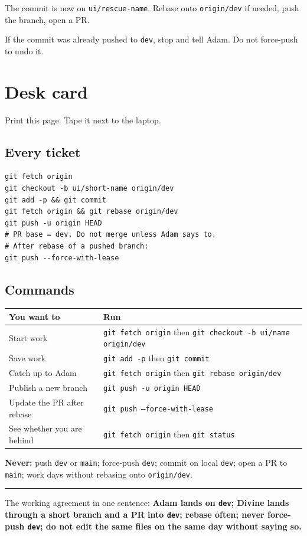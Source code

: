 \documentclass[11pt]{article}
\begin{document}
The commit is now on \texttt{ui/rescue-name}. Rebase onto \texttt{origin/dev} if needed, push the branch, open a PR.

If the commit was already pushed to \texttt{dev}, stop and tell Adam. Do not force-push to undo it.

\clearpage
\section{Desk card}

Print this page. Tape it next to the laptop.

\subsection*{Every ticket}

\begin{Verbatim}[fontsize=\small,frame=single,framesep=5pt]
git fetch origin
git checkout -b ui/short-name origin/dev
git add -p && git commit
git fetch origin && git rebase origin/dev
git push -u origin HEAD
# PR base = dev. Do not merge unless Adam says to.
# After rebase of a pushed branch:
git push --force-with-lease
\end{Verbatim}

\subsection*{Commands}

\begin{center}
\renewcommand{\arraystretch}{1.22}
\begin{tabular}{@{}L{2.15in}L{4.05in}@{}}
\toprule
\textbf{You want to} & \textbf{Run} \\
\midrule
Start work & \texttt{git fetch origin} then \texttt{git checkout -b ui/name origin/dev} \\
Save work & \texttt{git add -p} then \texttt{git commit} \\
Catch up to Adam & \texttt{git fetch origin} then \texttt{git rebase origin/dev} \\
Publish a new branch & \texttt{git push -u origin HEAD} \\
Update the PR after rebase & \texttt{git push --force-with-lease} \\
See whether you are behind & \texttt{git fetch origin} then \texttt{git status} \\
\bottomrule
\end{tabular}
\end{center}

\vspace{0.3em}
\noindent
\textbf{Never:} push \texttt{dev} or \texttt{main}; force-push \texttt{dev}; commit on local \texttt{dev}; open a PR to \texttt{main}; work days without rebasing onto \texttt{origin/dev}.

\vspace{0.45em}
\hrule
\vspace{0.55em}

\noindent
The working agreement in one sentence: \textbf{Adam lands on \texttt{dev}; Divine lands through a short branch and a PR into \texttt{dev}; rebase often; never force-push \texttt{dev}; do not edit the same files on the same day without saying so.}
\end{document}

